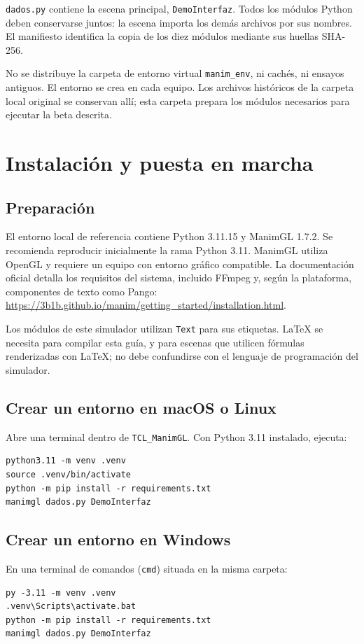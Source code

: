 \documentclass[11pt,a4paper]{article}
\begin{document}
\texttt{dados.py} contiene la escena principal, \texttt{DemoInterfaz}. Todos los módulos Python deben conservarse juntos: la escena importa los demás archivos por sus nombres. El manifiesto identifica la copia de los diez módulos mediante sus huellas SHA-256.

No se distribuye la carpeta de entorno virtual \texttt{manim\_env}, ni cachés, ni ensayos antiguos. El entorno se crea en cada equipo. Los archivos históricos de la carpeta local original se conservan allí; esta carpeta prepara los módulos necesarios para ejecutar la beta descrita.

\clearpage\section{Instalación y puesta en marcha}
\subsection{Preparación}
El entorno local de referencia contiene Python 3.11.15 y ManimGL 1.7.2. Se recomienda reproducir inicialmente la rama Python 3.11. ManimGL utiliza OpenGL y requiere un equipo con entorno gráfico compatible. La documentación oficial detalla los requisitos del sistema, incluido FFmpeg y, según la plataforma, componentes de texto como Pango:
\url{https://3b1b.github.io/manim/getting_started/installation.html}.

Los módulos de este simulador utilizan \texttt{Text} para sus etiquetas. LaTeX se necesita para compilar esta guía, y para escenas que utilicen fórmulas renderizadas con LaTeX; no debe confundirse con el lenguaje de programación del simulador.

\subsection{Crear un entorno en macOS o Linux}
Abre una terminal dentro de \texttt{TCL\_ManimGL}. Con Python 3.11 instalado, ejecuta:
\begin{lstlisting}
python3.11 -m venv .venv
source .venv/bin/activate
python -m pip install -r requirements.txt
manimgl dados.py DemoInterfaz
\end{lstlisting}

\subsection{Crear un entorno en Windows}
En una terminal de comandos (\texttt{cmd}) situada en la misma carpeta:
\begin{lstlisting}
py -3.11 -m venv .venv
.venv\Scripts\activate.bat
python -m pip install -r requirements.txt
manimgl dados.py DemoInterfaz
\end{lstlisting}
\end{document}
